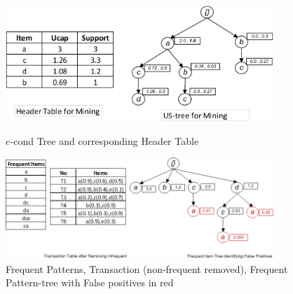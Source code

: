 \documentclass[conference]{IEEEtran}
\begin{document}
\begin{figure}[t]
    \begin{minipage}{0.5\linewidth}
	\centering
	\includegraphics[width=0.9\textwidth]{visio/M_TREE}  
	\caption{$e$-cond Tree and corresponding Header Table}%
	\label{figure:E_COND_TREE_HEADER_TABLE}
    \end{minipage}%
    \begin{minipage}{0.5\linewidth}
    \centering
%	
%	
		\includegraphics[width=0.9\textwidth]{visio/frequent_tree_final_ex}  
	\caption{Frequent Patterns, Transaction (non-frequent removed), Frequent Pattern-tree with False positives in red}%
	\label{figure:FALSE_NEGATIVE}
    \end{minipage}
\end{figure}
%
\end{document}
